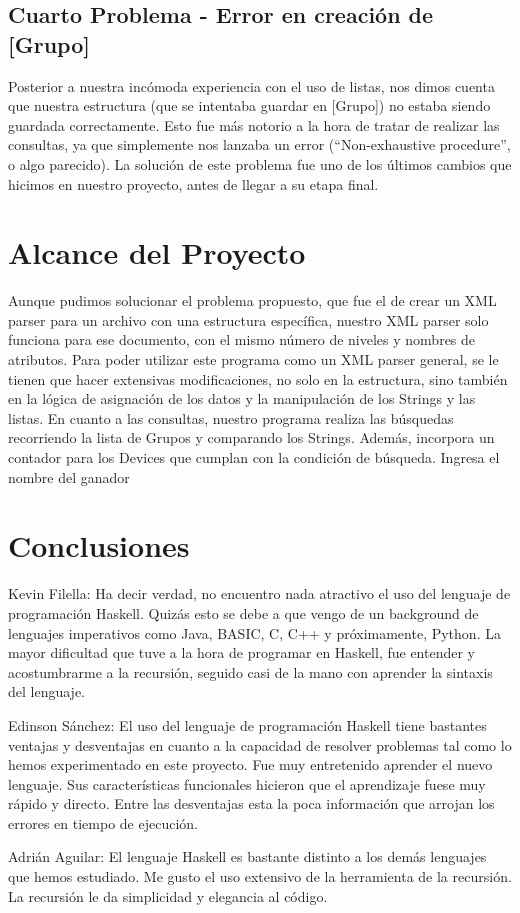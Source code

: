 \documentclass[11pt]{article} %
\begin{document}
\subsection{Cuarto Problema - Error en creación de [Grupo]}

Posterior a nuestra incómoda experiencia con el uso de listas, nos dimos cuenta que nuestra estructura (que se intentaba guardar en [Grupo]) no estaba siendo guardada correctamente. Esto fue más notorio a la hora de tratar de realizar las consultas, ya que simplemente nos lanzaba un error (“Non-exhaustive procedure”, o algo parecido). La solución de este problema fue uno de los últimos cambios que hicimos en nuestro proyecto, antes de llegar a su etapa final.

\section{Alcance del Proyecto}

Aunque pudimos solucionar el problema propuesto, que fue el de crear un XML parser para un archivo con una estructura específica, nuestro XML parser solo funciona para ese documento, con el mismo número de niveles y nombres de atributos. Para poder utilizar este programa como un XML parser general, se le tienen que hacer extensivas modificaciones, no solo en la estructura, sino también en la lógica de asignación de los datos y la manipulación de los Strings y las listas.
En cuanto a las consultas, nuestro programa realiza las búsquedas recorriendo la lista de Grupos y comparando los Strings. Además, incorpora un contador para los Devices que cumplan con la condición de búsqueda.
Ingresa el nombre del ganador


\section{Conclusiones}

Kevin Filella: Ha decir verdad, no encuentro nada atractivo el uso del lenguaje de programación Haskell. Quizás esto se debe a que vengo de un background de lenguajes imperativos como Java, BASIC, C, C++ y próximamente, Python. La mayor dificultad que tuve a la hora de programar en Haskell, fue entender y acostumbrarme a la recursión, seguido casi de la mano con aprender la sintaxis del lenguaje.


Edinson Sánchez: El uso del lenguaje de programación Haskell tiene bastantes ventajas y desventajas en cuanto a la capacidad de resolver problemas tal como lo hemos experimentado en este proyecto.  Fue muy entretenido aprender el nuevo lenguaje. Sus características funcionales hicieron que el aprendizaje fuese muy rápido y directo. Entre las desventajas esta la poca información que arrojan los errores en tiempo de ejecución. 


Adrián Aguilar: El lenguaje Haskell es bastante distinto a los demás lenguajes que hemos estudiado. Me gusto  el uso extensivo de la herramienta de la recursión.  La recursión le da simplicidad y elegancia al código.













  
\end{document}
